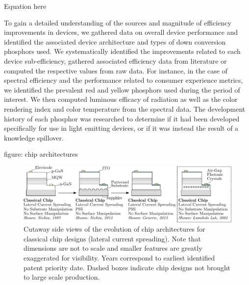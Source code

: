 \documentclass[a4paper]{spie}  %
\begin{document}
Equation here

To gain a detailed understanding of the sources and magnitude of efficiency improvements in devices, we gathered data on overall device performance and identified the associated device architecture and types of down conversion phosphors used. We systematically identified the improvements related to each device sub-efficiency, gathered associated efficiency data from literature or computed the respective values from raw data.
For instance, in the case of spectral efficiency and the performance related to consumer experience metrics, we identified the prevalent red and yellow phosphors used during the period of interest. We then computed luminous efficacy of radiation as well as the color rendering index and color temperature from the spectral data. The development history of each phosphor was researched to determine if it had been developed specifically for use in light emitting devices, or if it was instead the result of a knowledge spillover.


figure: chip architectures
\begin{figure} [ht]
    \begin{center}
        \includegraphics[width=\textwidth]{SPIE/article/chip_architectures.pdf}
    \end{center}
    \caption{Cutaway side views of the evolution of chip architectures for classical chip designs (lateral current spreading). Note that dimensions are not to scale and smaller features are greatly exaggerated for visibility. Years correspond to earliest identified patent priority date. Dashed boxes indicate chip designs not brought to large scale production.}
    \label{fig:chip_arch}
\end{figure}
\end{document}
